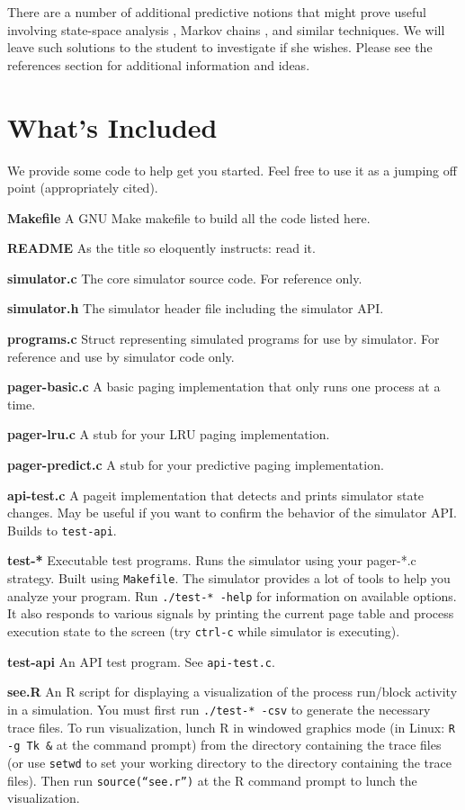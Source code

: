 \documentclass[12pt]{article}
\newenvironment{packed_enum}{
\begin{enumerate}
  \setlength{\itemsep}{1pt}
  \setlength{\parskip}{0pt}
  \setlength{\parsep}{0pt}
}{\end{enumerate}}
\begin{document}
There are a number of additional predictive notions that might prove
useful involving state-space analysis \cite{wiki-statespace}, Markov
chains \cite{wiki-markov},  and similar techniques.
We will leave such solutions to the student to investigate if she
wishes. Please see the references section for additional information
and ideas.

\section{What's Included}

We provide some code to help get you started. Feel free to use it as a
jumping off point (appropriately cited).

\begin{packed_enum}
\item {\bf Makefile} A GNU Make makefile to build all the code listed
  here.
\item {\bf README} As the title so eloquently instructs: read it.
\item {\bf simulator.c} The core simulator source code. For reference
  only.
\item {\bf simulator.h} The simulator header file including the simulator
  API.
\item {\bf programs.c} Struct representing simulated programs for use
  by simulator. For reference and use by simulator code only.
\item {\bf pager-basic.c} A basic paging implementation that only runs
  one process at a time.
\item {\bf pager-lru.c} A stub for your LRU paging implementation.
\item {\bf pager-predict.c} A stub for your predictive paging implementation.
\item {\bf api-test.c} A pageit implementation that detects and prints
  simulator state changes. May be useful if you want to confirm the
  behavior of the simulator API. Builds to \texttt{test-api}.
\item {\bf test-*} Executable test programs. Runs the simulator using
  your pager-*.c strategy. Built using \texttt{Makefile}. The simulator
  provides a lot of tools to help you analyze your program.
  Run \texttt{./test-* -help} for information on available options. It
  also responds to various signals by printing the current page table
  and process execution state to the screen (try \texttt{ctrl-c} while
  simulator is executing).
\item {\bf test-api} An API test program. See \texttt{api-test.c}.
\item {\bf see.R} An R script for displaying a visualization of the
  process run/block activity in a simulation.
  You must first run \texttt{./test-* -csv} to
  generate the necessary trace files. To run visualization, lunch R in
  windowed graphics mode (in Linux: \texttt{R -g Tk \&} at the command
  prompt) from the directory containing the trace
  files (or use \texttt{setwd} to set your working directory to the directory
  containing the trace files). Then run \texttt{source(``see.r'')} at the R
  command prompt to lunch the visualization.
\end{packed_enum}
\end{document}
